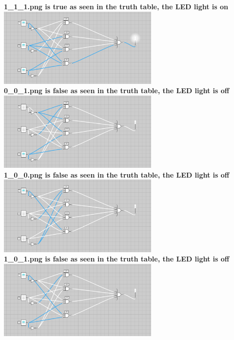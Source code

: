 \documentclass{article}
\begin{document}
\begin{enumerate}
\begin{center}
            \textbf{1\_1\_1.png is true as seen in the truth table, the LED light is on}\\
            \includegraphics[width=80mm]{circuits/1_1_1.png}\\[0.25in]

            \textbf{0\_0\_1.png is false as seen in the truth table, the LED light is off}\\
            \includegraphics[width=80mm]{circuits/0_0_1.png}\\[0.25in]

            \textbf{1\_0\_0.png is false as seen in the truth table, the LED light is off}\\
            \includegraphics[width=80mm]{circuits/1_0_0.png}\\[0.25in]

            \textbf{1\_0\_1.png is false as seen in the truth table, the LED light is off}\\
            \includegraphics[width=80mm]{circuits/1_0_1.png}\\[0.25in]


\end{center}
\end{enumerate}
\end{document}
